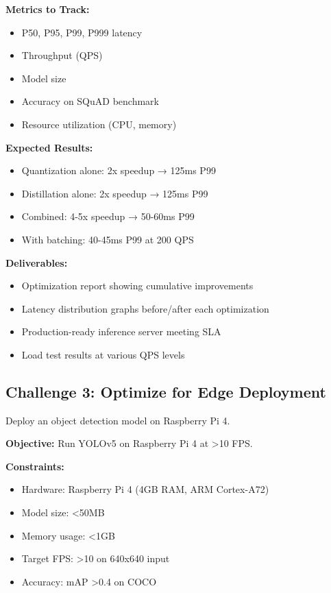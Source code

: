 \textbf{Metrics to Track:}
\begin{itemize}
    \item P50, P95, P99, P999 latency
    \item Throughput (QPS)
    \item Model size
    \item Accuracy on SQuAD benchmark
    \item Resource utilization (CPU, memory)
\end{itemize}

\textbf{Expected Results:}
\begin{itemize}
    \item Quantization alone: 2x speedup → 125ms P99
    \item Distillation alone: 2x speedup → 125ms P99
    \item Combined: 4-5x speedup → 50-60ms P99
    \item With batching: 40-45ms P99 at 200 QPS
\end{itemize}

\textbf{Deliverables:}
\begin{itemize}
    \item Optimization report showing cumulative improvements
    \item Latency distribution graphs before/after each optimization
    \item Production-ready inference server meeting SLA
    \item Load test results at various QPS levels
\end{itemize}

\subsection{Challenge 3: Optimize for Edge Deployment}

Deploy an object detection model on Raspberry Pi 4.

\textbf{Objective:} Run YOLOv5 on Raspberry Pi 4 at >10 FPS.

\textbf{Constraints:}
\begin{itemize}
    \item Hardware: Raspberry Pi 4 (4GB RAM, ARM Cortex-A72)
    \item Model size: <50MB
    \item Memory usage: <1GB
    \item Target FPS: >10 on 640x640 input
    \item Accuracy: mAP >0.4 on COCO
\end{itemize}

